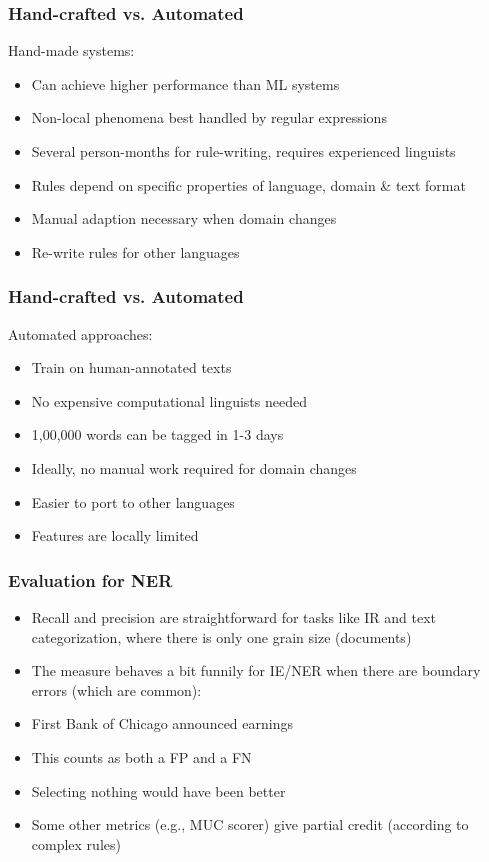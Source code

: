 \begin{frame}[fragile]\frametitle{Hand-crafted vs. Automated }
Hand-made systems:
  \begin{itemize}
  \item Can achieve higher performance than ML systems
  \item Non-local phenomena best handled by regular expressions
  \item Several person-months for rule-writing, requires experienced linguists
  \item Rules depend on specific properties of language, domain \& text format  
  \item Manual adaption necessary when domain changes
  \item Re-write rules for other languages
  \end{itemize}
\end{frame}

\begin{frame}[fragile]\frametitle{Hand-crafted vs. Automated }
Automated approaches:
  \begin{itemize}
  \item Train on human-annotated texts
  \item No expensive computational linguists needed
  \item 1,00,000 words can be tagged in 1-3 days
  \item Ideally, no manual work required for domain changes
  \item Easier to port to other languages
  \item Features are locally limited
  \end{itemize}
\end{frame}

\begin{frame}[fragile]\frametitle{Evaluation for NER }
  \begin{itemize}
  \item Recall and precision are straightforward for tasks like IR and text 
categorization, where there is only one grain size (documents)
  \item The measure behaves a bit funnily for IE/NER when there are 
boundary errors (which are common):
  \item First Bank of Chicago announced earnings
  \item This counts as both a FP and a FN
  \item Selecting nothing would have been better
  \item Some other metrics (e.g., MUC scorer) give partial credit (according to complex rules)
  \end{itemize}
\end{frame}


